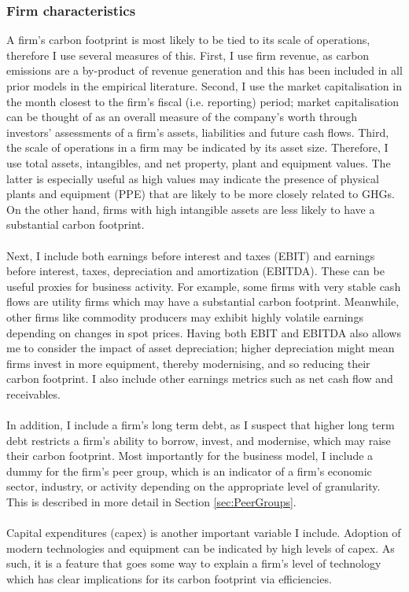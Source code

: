 \documentclass[12pt,twoside]{report}
\begin{document}
\subsubsection{Firm characteristics}
A firm's carbon footprint is most likely to be tied to its scale of operations, therefore I use several measures of this. First, I use firm revenue, as carbon emissions are a by-product of revenue generation and this has been included in all prior models in the empirical literature. Second, I use the market capitalisation in the month closest to the firm's fiscal (i.e. reporting) period; market capitalisation can be thought of as an overall measure of the company's worth through investors' assessments of a firm's assets, liabilities and future cash flows. Third, the scale of operations in a firm may be indicated by its asset size. Therefore, I use total assets, intangibles, and net property, plant and equipment values. The latter is especially useful as high values may indicate the presence of physical plants and equipment (PPE) that are likely to be more closely related to GHGs. On the other hand, firms with high intangible assets are less likely to have a substantial carbon footprint.
\\\\
Next, I include both earnings before interest and taxes (EBIT) and earnings before interest, taxes, depreciation and amortization (EBITDA). These can be useful proxies for business activity. For example, some firms with very stable cash flows are utility firms which may have a substantial carbon footprint. Meanwhile, other firms like commodity producers may exhibit highly volatile earnings depending on changes in spot prices. Having both EBIT and EBITDA also allows me to consider the impact of asset depreciation; higher depreciation might mean firms invest in more equipment, thereby modernising, and so reducing their carbon footprint. I also include other earnings metrics such as net cash flow and receivables. 
\\\\
In addition, I include a firm's long term debt, as I suspect that higher long term debt restricts a firm's ability to borrow, invest, and modernise, which may raise their carbon footprint. Most importantly for the business model, I include a dummy for the firm's peer group, which is an indicator of a firm's economic sector, industry, or activity depending on the appropriate level of granularity. This is described in more detail in Section \ref{sec:PeerGroups}.
\\\\
Capital expenditures (capex) is another important variable I include. Adoption of modern technologies and equipment can be indicated by high levels of capex. As such, it is a feature that goes some way to explain a firm's level of technology which has clear implications for its carbon footprint via efficiencies. 
\end{document}
